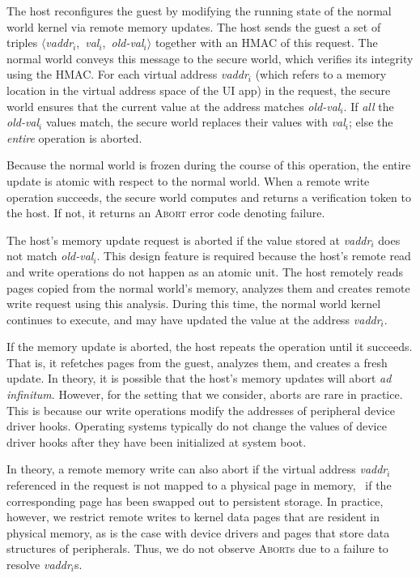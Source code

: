 %
The host reconfigures the guest by modifying the running state of the normal
world kernel via remote memory updates. The host sends the guest a set of
triples
$\langle$\textit{vaddr}$_i$,~\textit{val}$_i$,~\textit{old-val}$_i$$\rangle$
together with an HMAC of this request. The normal world conveys this message to
the secure world, which verifies its integrity using the HMAC.  For each
virtual address \textit{vaddr}$_i$ (which refers to a memory location in the
virtual address space of the UI app) in the request, the secure world ensures
that the current value at the address matches \textit{old-val}$_i$. If
\textit{all} the \textit{old-val}$_i$ values match, the secure world replaces
their values with \textit{val}$_i$; else the \textit{entire} operation is
aborted.

Because the normal world is frozen during the course of this operation, the
entire update is atomic with respect to the normal world. When a remote write
operation succeeds, the secure world computes and returns a verification token
to the host. If not, it returns an \textsc{Abort} error code denoting failure.

The host's memory update request is aborted if the value stored at
\textit{vaddr}$_i$ does not match \textit{old-val}$_i$.  This design feature is
required because the host's remote read and write operations do not happen as
an atomic unit. The host remotely reads pages copied from the normal world's
memory, analyzes them and creates remote write request using this analysis.
During this time, the normal world kernel continues to execute, and may have
updated the value at the address \textit{vaddr}$_i$.

If the memory update is aborted, the host repeats the operation until it
succeeds. That is, it refetches pages from the guest, analyzes them, and
creates a fresh update. In theory, it is possible that the host's memory
updates will abort \textit{ad infinitum}. However, for the setting that we
consider, aborts are rare in practice. This is because our
write operations modify the addresses of peripheral device driver hooks.
Operating systems typically do not change the values of device driver hooks
after they have been initialized at system boot. 

In theory, a remote memory write can also abort if the virtual address
\textit{vaddr}$_i$ referenced in the request is not mapped to a physical page
in memory, \ie~if the corresponding page has been swapped out to persistent
storage. In practice, however, we restrict remote writes to kernel data pages
that are resident in physical memory, as is the case with device drivers and
pages that store data structures of peripherals. Thus, we do not observe
\textsc{Abort}s due to a failure to resolve \textit{vaddr}$_i$s.

